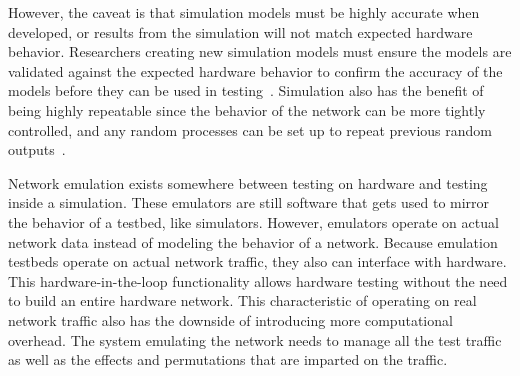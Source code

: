 However, the caveat is that simulation models must be highly accurate when developed, or results from the simulation will not match expected hardware behavior.
Researchers creating new simulation models must ensure the models are validated against the expected hardware behavior to confirm the accuracy of the models before they can be used in testing~\cite{omnet_manager}.
Simulation also has the benefit of being highly repeatable since the behavior of the network can be more tightly controlled, and any random processes can be set up to repeat previous random outputs~\cite{simulation_emulation}.\par
Network emulation exists somewhere between testing on hardware and testing inside a simulation.
These emulators are still software that gets used to mirror the behavior of a testbed, like simulators.
However, emulators operate on actual network data instead of modeling the behavior of a network.
Because emulation testbeds operate on actual network traffic, they also can interface with hardware.
This hardware-in-the-loop functionality allows hardware testing without the need to build an entire hardware network.
This characteristic of operating on real network traffic also has the downside of introducing more computational overhead.
The system emulating the network needs to manage all the test traffic as well as the effects and permutations that are imparted on the traffic.\par

